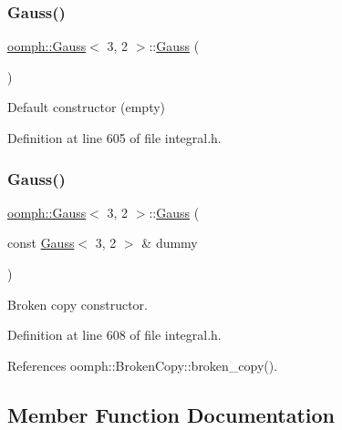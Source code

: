 \subsubsection{\texorpdfstring{Gauss()}{Gauss()}\hspace{0.1cm}{\footnotesize\ttfamily [1/2]}}
{\footnotesize\ttfamily \hyperlink{classoomph_1_1Gauss}{oomph\+::\+Gauss}$<$ 3, 2 $>$\+::\hyperlink{classoomph_1_1Gauss}{Gauss} (\begin{DoxyParamCaption}{ }\end{DoxyParamCaption})\hspace{0.3cm}{\ttfamily [inline]}}



Default constructor (empty) 



Definition at line 605 of file integral.\+h.

\mbox{\label{classoomph_1_1Gauss_3_013_00_012_01_4_a38e1a26bd3382261ff0aaf21a028a49d}} 
\subsubsection{\texorpdfstring{Gauss()}{Gauss()}\hspace{0.1cm}{\footnotesize\ttfamily [2/2]}}
{\footnotesize\ttfamily \hyperlink{classoomph_1_1Gauss}{oomph\+::\+Gauss}$<$ 3, 2 $>$\+::\hyperlink{classoomph_1_1Gauss}{Gauss} (\begin{DoxyParamCaption}\item[{const \hyperlink{classoomph_1_1Gauss}{Gauss}$<$ 3, 2 $>$ \&}]{dummy }\end{DoxyParamCaption})\hspace{0.3cm}{\ttfamily [inline]}}



Broken copy constructor. 



Definition at line 608 of file integral.\+h.



References oomph\+::\+Broken\+Copy\+::broken\+\_\+copy().



\subsection{Member Function Documentation}
\mbox{\label{classoomph_1_1Gauss_3_013_00_012_01_4_a5527b494cb1805a9720b45fea47546ea}} 
